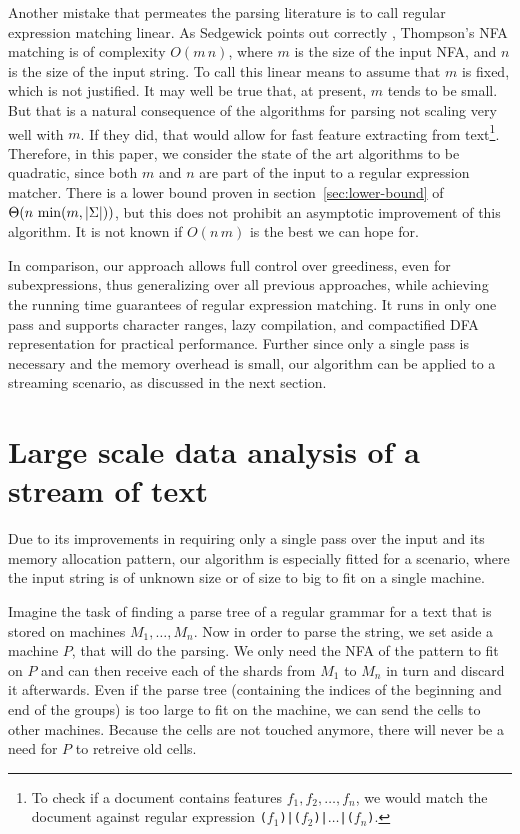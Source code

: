\documentclass[11pt,a4paper,twoside,openright]{Thesis}
\theoremstyle{definition}
\newcommand{\Secref}[1]{section~\ref{sec:#1}}
\begin{document}
Another mistake that permeates the parsing literature is to call
regular expression matching linear. As Sedgewick points out correctly
\cite{Sedg90a}, Thompson's NFA matching is of complexity $O(m\, n)$,
where $m$ is the size of the input NFA, and $n$ is the size of the
input string. To call this linear means to assume that $m$ is fixed,
which is not justified. It may well be true that, at present, $m$
tends to be small. But that is a natural consequence of the algorithms for
parsing not scaling very well with $m$. If they did, that would allow for
fast feature extracting from text\footnote{To check if a document
contains features $f_1, f_2, \dots, f_n$, we would match the document
against regular expression \texttt{($f_1$)|($f_2$)|$\dots$|($f_n$)}.}.
Therefore, in this paper, we consider the state of the art algorithms
to be quadratic, since both $m$ and $n$ are part of the input to a
regular expression matcher. There is a lower bound proven in 
\Secref{lower-bound} of $\Theta(n\, \min(m, \left|\Sigma\right|))$, but this does 
not prohibit an asymptotic improvement of this algorithm. It is not known if 
$O(n\, m)$ is the best we can hope for.

In comparison, our approach allows full control over greediness, even for
subexpressions, thus generalizing over all previous approaches, while achieving
the running time guarantees of regular expression matching. It runs in only one
pass and supports character ranges, lazy compilation, and compactified DFA
representation for practical performance. Further since only a single pass is 
necessary and the memory overhead is small, our algorithm can be applied to a 
streaming scenario, as discussed in the next section.

\section{Large scale data analysis of a stream of text}
Due to its improvements in requiring only a single pass over the input and 
its memory allocation pattern, our algorithm is especially fitted for a 
scenario, where the input string is of unknown size or of size to big to fit 
on a single machine. 

Imagine the task of finding a parse tree of a regular grammar for a text 
that is stored on machines $M_1, \dots, M_n$. Now in order to parse the 
string, we set aside a machine $P$, that will do the parsing. We only need the NFA of the 
pattern to fit on $P$ and can then receive each of the shards 
from $M_1$ to $M_n$ in turn and discard it afterwards. Even if the parse tree 
(containing the indices of the beginning and end of the groups) is too large 
to fit on the machine, we can send the cells to other machines. Because the 
cells are not touched anymore, there will never be a need for $P$ to retreive 
old cells.
\end{document}
